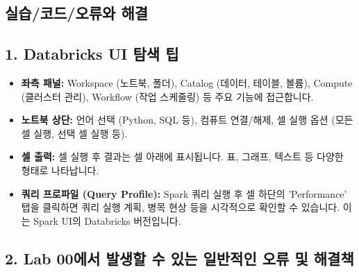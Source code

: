 \documentclass[11pt,a4paper]{article}
\theoremstyle{definition}
\begin{document}
\begin{itemize}
\section*{실습/코드/오류와 해결}

\subsection*{1. Databricks UI 탐색 팁}

\begin{itemize}
    \item \textbf{좌측 패널:} Workspace (노트북, 폴더), Catalog (데이터, 테이블, 볼륨), Compute (클러스터 관리), Workflow (작업 스케줄링) 등 주요 기능에 접근합니다.
    \item \textbf{노트북 상단:} 언어 선택 (Python, SQL 등), 컴퓨트 연결/해제, 셀 실행 옵션 (모든 셀 실행, 선택 셀 실행 등).
    \item \textbf{셀 출력:} 셀 실행 후 결과는 셀 아래에 표시됩니다. 표, 그래프, 텍스트 등 다양한 형태로 나타납니다.
    \item \textbf{쿼리 프로파일 (Query Profile):} Spark 쿼리 실행 후 셀 하단의 'Performance' 탭을 클릭하면 쿼리 실행 계획, 병목 현상 등을 시각적으로 확인할 수 있습니다. 이는 Spark UI의 Databricks 버전입니다.
\end{itemize}

\subsection*{2. Lab 00에서 발생할 수 있는 일반적인 오류 및 해결책}


\end{itemize}
\end{document}
